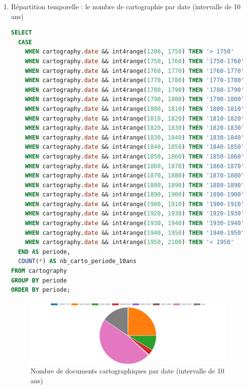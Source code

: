 \begin{enumerate}
\begin{enumerate}
        \item Répartition temporelle : le nombre de cartographie par date (intervalle de 10 ans)
            \begin{lstlisting}[language=SQL, caption=Nombre de documents cartographiques par date (intervalle de 10 ans)]
SELECT 
  CASE 
    WHEN cartography.date && int4range(1200, 1750) THEN '> 1750' 
    WHEN cartography.date && int4range(1750, 1760) THEN '1750-1760' 
	WHEN cartography.date && int4range(1760, 1770) THEN '1760-1770' 
	WHEN cartography.date && int4range(1770, 1780) THEN '1770-1780' 
	WHEN cartography.date && int4range(1780, 1790) THEN '1780-1790' 
	WHEN cartography.date && int4range(1790, 1800) THEN '1790-1800' 
	WHEN cartography.date && int4range(1800, 1810) THEN '1800-1810' 
	WHEN cartography.date && int4range(1810, 1820) THEN '1810-1820' 
	WHEN cartography.date && int4range(1820, 1830) THEN '1820-1830' 
	WHEN cartography.date && int4range(1830, 1840) THEN '1830-1840' 
	WHEN cartography.date && int4range(1840, 1850) THEN '1840-1850' 
	WHEN cartography.date && int4range(1850, 1860) THEN '1850-1860' 
	WHEN cartography.date && int4range(1860, 1870) THEN '1860-1870' 
	WHEN cartography.date && int4range(1870, 1880) THEN '1870-1880' 
	WHEN cartography.date && int4range(1880, 1890) THEN '1880-1890' 
	WHEN cartography.date && int4range(1890, 1900) THEN '1890-1900' 
	WHEN cartography.date && int4range(1900, 1910) THEN '1900-1910' 
	WHEN cartography.date && int4range(1920, 1930) THEN '1920-1930' 
	WHEN cartography.date && int4range(1930, 1940) THEN '1930-1940' 
	WHEN cartography.date && int4range(1940, 1950) THEN '1940-1950' 
	WHEN cartography.date && int4range(1950, 2100) THEN '< 1950' 
  END AS periode, 
  COUNT(*) AS nb_carto_periode_10ans
FROM cartography 
GROUP BY periode 
ORDER BY periode; \end{lstlisting}

\begin{figure}[ht!]
    \centering
    \includegraphics[width=1\linewidth]{images/graphiques/nb_carto_date_10.png}
    \caption{Nombre de documents cartographiques par date (intervalle de 10 ans)}
    \label{fig:nb_carto_date10}
\end{figure}


\end{enumerate}
\end{enumerate}
